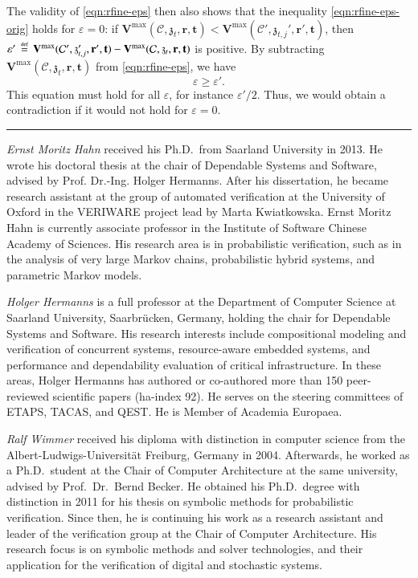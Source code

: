 \documentclass[10pt,twocolumn]{article}
\def\qedsymbol{\rule{2mm}{2mm}}
\def\qed{\hfill{\qedsymbol}\vskip 1pt}
\newcommand{\cmodel}{\mathcal{C}}
\newcommand{\rew}{\mathbf{r}}
\newcommand{\timeb}{\mathbf{t}}
\newcommand{\mvalue}{\mathbf{V}}
\newcommand{\precision}{\varepsilon}
\newcommand{\astate}{\mathfrak{z}}
\newcommand{\refeqn}[1]{\texorpdfstring{\hyperref[eqn:#1]{\eqref{eqn:#1}}}{\eqref{eqn:#1}}}
\newcommand{\defeq}{\,\stackrel{\mbox{\rm {\tiny def}}}{=}\,}
\begin{document}
The validity of \refeqn{rfine-eps} then also shows that the inequality \refeqn{rfine-eps-orig} holds for $\precision = 0$:
if $\mvalue^{\max}(\cmodel, \astate_t, \rew, \timeb) < \mvalue^{\max}(\cmodel', \astate_{t,j}', \rew', \timeb)$, then $\precision' \defeq \mvalue^{\max}(\cmodel', \astate_{t,j}', \rew', \timeb) - \mvalue^{\max}(\cmodel, \astate_t, \rew, \timeb)$ is positive.
By subtracting $\mvalue^{\max}(\cmodel, \astate_t, \rew, \timeb)$ from \refeqn{rfine-eps}, we have
\begin{equation*}
  \precision \geq \precision' .
\end{equation*}
This equation must hold for all $\precision$, for instance $\precision'/2$.
Thus, we would obtain a contradiction if it would not hold for $\precision = 0$.

\qed

\balance




\clearpage


\textit{Ernst Moritz Hahn} received his Ph.D.\ from Saarland University in 2013.
He wrote his
doctoral thesis at the chair of Dependable Systems and Software, advised
by Prof. Dr.-Ing. Holger Hermanns. After his dissertation, he became
research assistant at the group of automated verification at the
University of Oxford in the VERIWARE project lead by Marta Kwiatkowska.
Ernst Moritz Hahn is currently associate professor in the Institute of
Software Chinese Academy of Sciences. His research area is in
probabilistic verification, such as in the analysis of very large Markov chains,
probabilistic hybrid systems, and parametric Markov models.

\medskip

\textit{Holger Hermanns} is a full professor at the Department of Computer Science at Saarland University, Saarbr{\"u}cken, Germany, holding the chair for Dependable Systems and Software.
His research interests include compositional modeling and verification of concurrent systems, resource-aware embedded systems, and performance and dependability evaluation of critical infrastructure.
In these areas, Holger Hermanns has authored or co-authored more than 150 peer-reviewed scientific papers (ha-index 92).
He serves on the steering committees of ETAPS, TACAS, and QEST.
He is Member of Academia Europaea. 

\medskip

\textit{Ralf Wimmer} received his diploma with distinction 
in computer science from the Albert-Ludwigs-Universit\"at Freiburg, 
Germany in 2004. Afterwards, he
worked as a Ph.D.\ student at the Chair of Computer Architecture at the
same university, advised by Prof.\ Dr.\ Bernd Becker. He obtained his Ph.D.\ degree 
with distinction in 2011 for his thesis on symbolic methods for
probabilistic verification. Since then, he is continuing his work as a
research assistant and leader of the verification group at the Chair
of Computer Architecture. His research focus is on symbolic methods
and solver technologies, and their application for the verification of
digital and stochastic systems.
\end{document}
